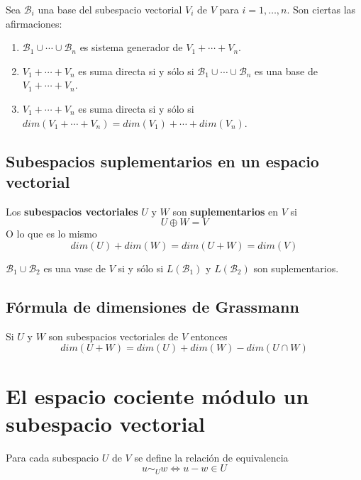 \begin{lem}
	Sea $\mathcal{B}_i$ una base del subespacio vectorial $V_i$ de $V$ para $i=1,\ldots,n$. Son ciertas las afirmaciones:
	\begin{enumerate}
		\item $\mathcal{B}_1 \cup \cdots \cup \mathcal{B}_n$ es sistema generador de $V_1 + \cdots + V_n$.
		\item $V_1 + \cdots + V_n$ es suma directa si y sólo si $\mathcal{B}_1 \cup \cdots \cup \mathcal{B}_n$ es una base de $V_1 + \cdots + V_n$.
		\item $V_1 + \cdots + V_n$ es suma directa si y sólo si $dim(V_1 + \cdots + V_n)=dim(V_1) + \cdots + dim(V_n)$.
	\end{enumerate}
\end{lem}

\subsection{Subespacios suplementarios en un espacio vectorial}

\begin{defi}
	Los \textbf{subespacios vectoriales} $U$ y $W$ son \textbf{suplementarios} en $V$ si
	\[U \oplus W = V\] 
	O lo que es lo mismo
	\[
	dim(U)+dim(W)= dim(U+W)=dim(V)
	\]
\end{defi}

\begin{prop}
	$\mathcal{B}_1 \cup \mathcal{B}_2$ es una vase de $V$ si y sólo si $L(\mathcal{B}_1)$ y $L(\mathcal{B}_2)$ son suplementarios.
\end{prop}

\subsection{Fórmula de dimensiones de Grassmann}

\begin{theorem}
	Si $U$ y $W$ son subespacios vectoriales de $V$ entonces
	\[
	dim(U+W)=dim(U)+dim(W)-dim(U \cap W)
	\]
\end{theorem}

\section{El espacio cociente módulo un subespacio vectorial}

Para cada subespacio $U$ de $V$ se define la relación de equivalencia
\[
u \sim_U w \Leftrightarrow u - w \in U
\]

